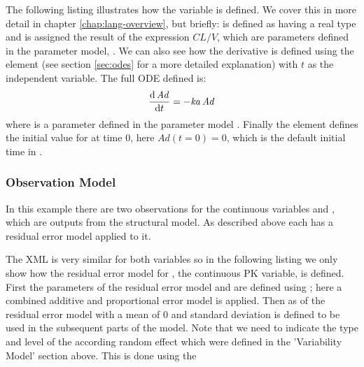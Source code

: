 The following listing  illustrates how the variable 
is defined. We cover this in more detail in chapter
\ref{chap:lang-overview}, but briefly:  is defined as having a
real type and is assigned the result of the expression $CL/V$, which
are parameters defined in the parameter model, . We can also
see how the derivative  is defined using the element 
(see section \ref{sec:odes} for a more detailed explanation)
with $t$ as the independent variable. The full ODE defined is:
\[
\frac{\mathrm{d}\,\var{Ad}}{\mathrm{d}t} = -\var{ka} \, \var{Ad}
\]
where  is a parameter defined in the parameter model .
Finally the  element defines
the initial value for  at time 0, here $Ad(t\!=\!0)\!=\!0$, which is the default initial time
in \pharmml.
%

\subsubsection{Observation Model}
\label{sec:eg1-obs-model}

In this example there are two observations for the continuous
variables  and , which are outputs from the structural
model. As described above each has a residual error model applied to it.


The XML is very similar for both variables so in the following listing 
we only show how the residual error model for , the continuous PK variable, is defined.
First the parameters of the residual error model  and  are
defined using ; here a combined additive
and proportional error model is applied. Then  as 
of the residual error model with a mean of $0$ and standard deviation  is defined
to be used in the subsequent parts of the model. Note that we need to 
indicate the type and level of the according random effect which were
defined in the 'Variability Model' section above. This is done
using the  

